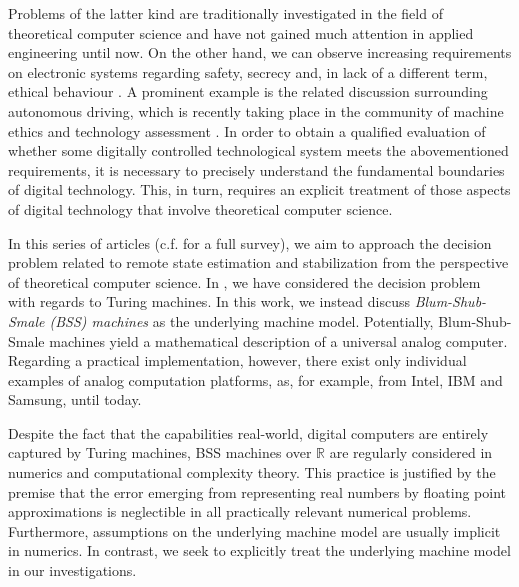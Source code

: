 \documentclass[conference]{IEEEtran}
\def\RR{{\mathbb R}}
\newcommand{\sdummy}{{\color{red}[SOURCE]}}
\newcommand{\tbr}[1]{}
\begin{document}
	Problems of the latter kind are traditionally investigated in the field of theoretical computer science and have not gained much attention in applied engineering until now. 
	On the other hand, we can observe increasing requirements on electronic systems regarding safety, secrecy and, in lack of a different term, ethical behaviour \tbr{\sdummy}. 
	A prominent example is the related discussion surrounding autonomous driving, which is recently taking place in the community of machine ethics and technology assessment \tbr{\sdummy}. 
	In order to obtain a qualified evaluation of whether some digitally controlled technological system meets the abovementioned requirements, it is necessary to precisely understand 
	the fundamental boundaries of digital technology. This, in turn, requires an explicit treatment of those aspects of digital technology that involve theoretical computer science.

	In this series of articles (c.f. \cite{BoBoDe21X} for a full survey), we aim to approach the decision problem related to remote state estimation and stabilization from the perspective 
	of theoretical computer science. In \cite{BoBoDe21TAC}\tbr{{\color{red}\(\leftarrow\) Change to TAC!~}}, we have considered the decision problem with regards to Turing machines. In this work, we instead discuss 
	\emph{Blum-Shub-Smale (BSS) machines} as the underlying machine model. Potentially, Blum-Shub-Smale machines yield a mathematical description of a universal analog computer.
	Regarding a practical implementation, however, there exist only individual examples of analog computation platforms, as, for example, from Intel, IBM and Samsung, until today. 
	
	Despite the fact that the capabilities real-world, digital computers are 
	entirely captured by Turing machines, BSS machines over \(\RR\) are regularly considered in numerics and computational complexity theory. 
	This practice is justified by the premise that the error emerging from representing real numbers by floating point approximations is neglectible in all practically relevant numerical problems. 
	Furthermore, assumptions on the underlying machine model are usually implicit in numerics. In contrast, we seek to explicitly treat the underlying machine model in our investigations.
\end{document}
